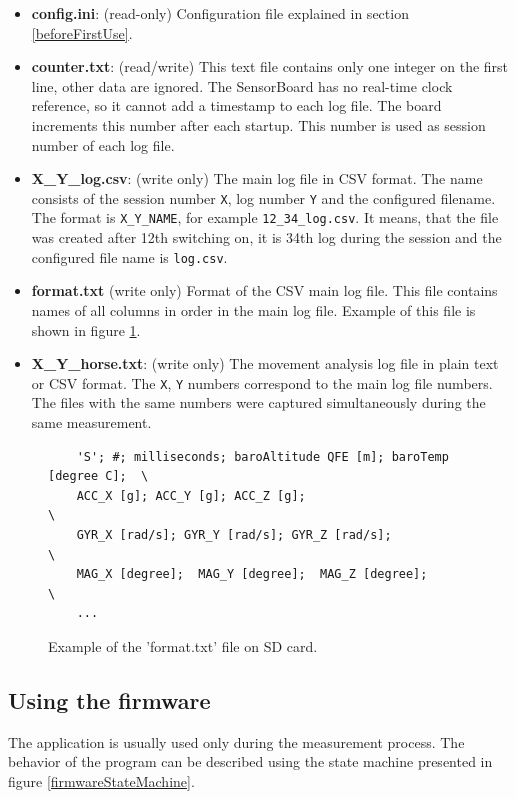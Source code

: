 \begin{itemize}
	\item \textbf{config.ini}: (read-only) Configuration file explained in section \ref{beforeFirstUse}.
	\item \textbf{counter.txt}: (read/write) This text file contains only one integer on the first line, other data are ignored. The SensorBoard has no real-time clock reference, so it cannot add a timestamp to each log file. The board increments this number after each startup. This number is used as session number of each log file.
	\item \textbf{X\_Y\_log.csv}: (write only) The main log file in CSV format. The name consists of the session number \texttt{X}, log number \texttt{Y} and the configured filename. The format is \texttt{X\_Y\_NAME}, for example \texttt{12\_34\_log.csv}. It means, that the file was created after 12th switching on, it is 34th log during the session and the configured file name is \texttt{log.csv}.
	\item \textbf{format.txt} (write only) Format of the CSV main log file. This file contains names of all columns in order in the main log file. Example of this file is shown in figure \ref{formatFile}.
	\item \textbf{X\_Y\_horse.txt}: (write only) The movement analysis log file in plain text or CSV format. The \texttt{X}, \texttt{Y} numbers correspond to the main log file numbers. The files with the same numbers were captured simultaneously during the same measurement.
\end{itemize}

\begin{figure}
	\centering
	\label{formatFile}
	\caption{Example of the 'format.txt' file on SD card.}
	\begin{verbatim}
	'S'; #; milliseconds; baroAltitude QFE [m]; baroTemp [degree C];  \
	ACC_X [g]; ACC_Y [g]; ACC_Z [g];                                  \
	GYR_X [rad/s]; GYR_Y [rad/s]; GYR_Z [rad/s];                      \
	MAG_X [degree];  MAG_Y [degree];  MAG_Z [degree];                 \
	...
	\end{verbatim}
\end{figure}

\subsection{Using the firmware}
The application is usually used only during the measurement process. The behavior of the program can be described using the state machine presented in figure \ref{firmwareStateMachine}.

